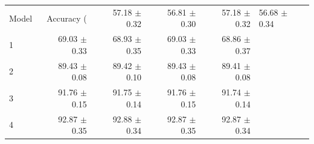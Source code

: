 \begin{tabular}{lrrrr}
\hline
Model & Accuracy (%
 & 57.18 $\pm$ 0.32 & 56.81 $\pm$ 0.30 & 57.18 $\pm$ 0.32 & 56.68 $\pm$ 0.34 \\
1 & 69.03 $\pm$ 0.33 & 68.93 $\pm$ 0.35 & 69.03 $\pm$ 0.33 & 68.86 $\pm$ 0.37 \\
2 & 89.43 $\pm$ 0.08 & 89.42 $\pm$ 0.10 & 89.43 $\pm$ 0.08 & 89.41 $\pm$ 0.08 \\
3 & 91.76 $\pm$ 0.15 & 91.75 $\pm$ 0.14 & 91.76 $\pm$ 0.15 & 91.74 $\pm$ 0.14 \\
4 & 92.87 $\pm$ 0.35 & 92.88 $\pm$ 0.34 & 92.87 $\pm$ 0.35 & 92.87 $\pm$ 0.34 \\
\hline
\end{tabular}